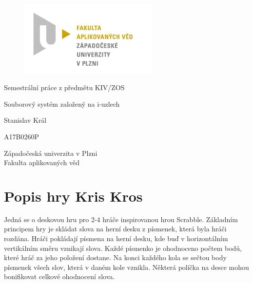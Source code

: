 \documentclass[12pt, a4paper]{article}
\let\oldsection\section
\renewcommand\section{\clearpage\oldsection}
\begin{document}
	\renewcommand{\lstlistingname}{Ukázka zprávy}
	\renewcommand{\lstlistlistingname}{Seznam ukázek}
    \begin{titlepage}

       \centering

       \vspace*{\baselineskip}

       \begin{figure}[H]
          \centering
          \includegraphics[width=7cm]{img/fav-logo.jpg}
       \end{figure}

       \vspace*{1\baselineskip}
       {\sc Semestrální práce z předmětu KIV/ZOS}
       \vspace*{1\baselineskip}

       \vspace{0.75\baselineskip}

       {\LARGE\sc Souborový systém založený na i-uzlech\\}

       \vspace{4\baselineskip}
       
		\vspace{0.5\baselineskip}

       
       {\sc\Large Stanislav Král \\}

       \vspace{0.5\baselineskip}

       {A17B0260P}

       \vfill

       {\sc Západočeská univerzita v Plzni\\
       Fakulta aplikovaných věd}


    \end{titlepage}


    \tableofcontents
    \pagebreak


    \section{Popis hry Kris Kros}
    Jedná se o deskovou hru pro 2-4 hráče inspirovanou hrou Scrabble. Základním principem hry je skládat slova na herní desku z písmenek, která byla hráči rozdána. Hráči pokládají písmena na herní desku, kde buď v horizontálním vertikálním směru vznikají slova. Každé písmenko je ohodnoceno počtem bodů, které hráč za jeho položení dostane. Na konci každého kola se sečtou body písmenek všech slov, která v daném kole vznikla. Některá políčka na desce mohou bonifikovat celkové ohodnocení slova.
\end{document}
